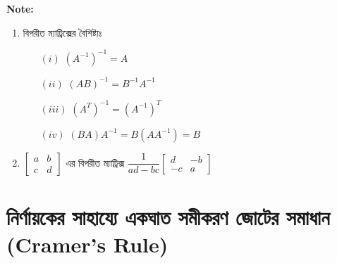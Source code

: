 \begin{tcolorbox}
	\textbf{Note:} 
	\begin{enumerate}
		\item বিপরীত ম্যাট্রিক্সের বৈশিষ্ট্যঃ 
		\begin{itemize}
			\item[$(i)$] $(A^{-1})^{-1}=A$
			\item[$(ii)$] $(AB)^{-1}=B^{-1}A^{-1}$
			\item[$(iii)$] $(A^T)^{-1}=(A^{-1})^T$
			\item[$(iv)$] $(BA)A^{-1}=B(AA^{-1})=B$
		\end{itemize}
		\item $\left[\begin{array}{cc}
				a & b \\
				c & d
				\end{array}\right]$ এর বিপরীত ম্যাট্রিক্স $\dfrac{1}{ad-bc}\left[\begin{array}{rr}
				d & -b \\
				-c & a
				\end{array}\right]$
	\end{enumerate}
\end{tcolorbox}
\newpage
\section{নির্ণায়কের সাহায্যে  একঘাত সমীকরণ জোটের সমাধান \\(Cramer's Rule)}
